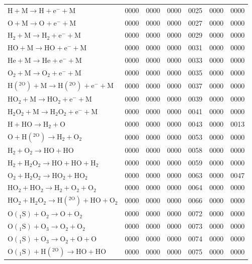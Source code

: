 \begin{longtable}{lrrrrrr}
$\mathrm{H + M \rightarrow H^{} + e^{-} + M}$ & 0000 & 0000 & 0000 & 0025 & 0000 & 0000 \\
$\mathrm{O + M \rightarrow O^{} + e^{-} + M}$ & 0000 & 0000 & 0000 & 0027 & 0000 & 0000 \\
$\mathrm{H_2 + M \rightarrow H_2^{} + e^{-} + M}$ & 0000 & 0000 & 0000 & 0029 & 0000 & 0000 \\
$\mathrm{HO + M \rightarrow HO^{} + e^{-} + M}$ & 0000 & 0000 & 0000 & 0031 & 0000 & 0000 \\
$\mathrm{He + M \rightarrow He^{} + e^{-} + M}$ & 0000 & 0000 & 0000 & 0033 & 0000 & 0000 \\
$\mathrm{O_2 + M \rightarrow O_2^{} + e^{-} + M}$ & 0000 & 0000 & 0000 & 0035 & 0000 & 0000 \\
$\mathrm{H(^{2O}) + M \rightarrow H(^{2O})^{} + e^{-} + M}$ & 0000 & 0000 & 0000 & 0037 & 0000 & 0000 \\
$\mathrm{HO_2 + M \rightarrow HO_2^{} + e^{-} + M}$ & 0000 & 0000 & 0000 & 0039 & 0000 & 0000 \\
$\mathrm{H_2O_2 + M \rightarrow H_2O_2^{} + e^{-} + M}$ & 0000 & 0000 & 0000 & 0041 & 0000 & 0000 \\
$\mathrm{H + HO \rightarrow H_2 + O}$ & 0000 & 0000 & 0000 & 0043 & 0000 & 0013 \\
$\mathrm{O + H(^{2O}) \rightarrow H_2 + O_2}$ & 0000 & 0000 & 0000 & 0053 & 0000 & 0000 \\
$\mathrm{H_2 + O_2 \rightarrow HO + HO}$ & 0000 & 0000 & 0000 & 0058 & 0000 & 0000 \\
$\mathrm{H_2 + H_2O_2 \rightarrow HO + HO + H_2}$ & 0000 & 0000 & 0000 & 0059 & 0000 & 0000 \\
$\mathrm{O_2 + H_2O_2 \rightarrow HO_2 + HO_2}$ & 0000 & 0000 & 0000 & 0063 & 0000 & 0047 \\
$\mathrm{HO_2 + HO_2 \rightarrow H_2 + O_2 + O_2}$ & 0000 & 0000 & 0000 & 0064 & 0000 & 0000 \\
$\mathrm{HO_2 + H_2O_2 \rightarrow H(^{2O}) + HO + O_2}$ & 0000 & 0000 & 0000 & 0066 & 0000 & 0000 \\
$\mathrm{O(_1S) + O_2 \rightarrow O + O_2}$ & 0000 & 0000 & 0000 & 0072 & 0000 & 0000 \\
$\mathrm{O(_1S) + O_3 \rightarrow O_2 + O_2}$ & 0000 & 0000 & 0000 & 0073 & 0000 & 0000 \\
$\mathrm{O(_1S) + O_3 \rightarrow O_2 + O + O}$ & 0000 & 0000 & 0000 & 0074 & 0000 & 0000 \\
$\mathrm{O(_1S) + H(^{2O}) \rightarrow HO + HO}$ & 0000 & 0000 & 0000 & 0075 & 0000 & 0000 \\

\end{longtable}
